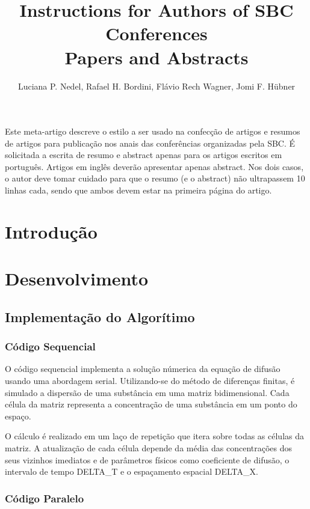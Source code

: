 \documentclass[12pt]{article}
\title{Instructions for Authors of SBC Conferences\\ Papers and Abstracts}
\author{Luciana P. Nedel\inst{1}, Rafael H. Bordini\inst{2}, Flávio Rech
  Wagner\inst{1}, Jomi F. Hübner\inst{3} }
\begin{document}
 

\maketitle
     
\begin{resumo} 
  Este meta-artigo descreve o estilo a ser usado na confecção de artigos e
  resumos de artigos para publicação nos anais das conferências organizadas
  pela SBC. É solicitada a escrita de resumo e abstract apenas para os artigos
  escritos em português. Artigos em inglês deverão apresentar apenas abstract.
  Nos dois casos, o autor deve tomar cuidado para que o resumo (e o abstract)
  não ultrapassem 10 linhas cada, sendo que ambos devem estar na primeira
  página do artigo.
\end{resumo}

\section{Introdução}

\section{Desenvolvimento}

\subsection{Implementação do Algorítimo}

\subsubsection{Código Sequencial}

O código sequencial implementa a solução númerica da equação de difusão usando uma abordagem serial. Utilizando-se do método de diferenças finitas, é simulado a dispersão de uma substância em uma matriz bidimensional. Cada célula da matriz representa a concentração de uma substância em um ponto do espaço.

O cálculo é realizado em um laço de repetição que itera sobre todas as células da matriz. A atualização de cada célula depende da média das concentrações dos seus vizinhos imediatos e de parâmetros físicos como coeficiente de difusão, o intervalo de tempo DELTA\_T e o espaçamento espacial DELTA\_X.

\subsubsection{Código Paralelo}
\end{document}
